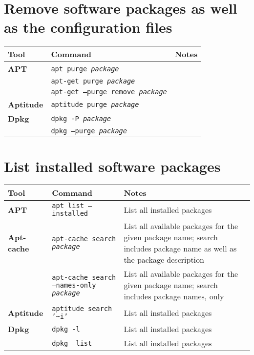 \documentclass[10pt]{article}
\begin{document}
\section{Remove software packages as well as the configuration files}
\begin{tabular}{ p{3.5cm} p{9cm} p{11cm}}
  \hline
  \rowcolor{Gray}
  \textbf{Tool} & \textbf{Command} & \textbf{Notes} \\
  \hline 
  \textbf{APT}& \texttt{apt purge \textit{package}} & \\
  \rowcolor{Gray}
  & \texttt{apt-get purge \textit{package}} & \\
  & \texttt{apt-get --purge remove \textit{package}} & \\
  \rowcolor{Gray}
  \textbf{Aptitude} & \texttt{aptitude purge \textit{package}} & \\
  \textbf{Dpkg} & \texttt{dpkg -P \textit{package}} & \\
  \rowcolor{Gray}
  & \texttt{dpkg --purge \textit{package}} & \\
  \hline
\end{tabular}

\section{List installed software packages}
\begin{tabular}{ p{3.5cm} p{9cm} p{11cm}}
  \hline
  \rowcolor{Gray}
  \textbf{Tool} & \textbf{Command} & \textbf{Notes} \\
  \hline 
  \textbf{APT}& \texttt{apt list --installed} & List all installed packages\\
  \rowcolor{Gray}
  \textbf{Apt-cache} & \texttt{apt-cache search \textit{package}} & List all available packages for the given package name; search includes package name as well as the package description \\
  & \texttt{apt-cache search --names-only \textit{package}} & List all available packages for the given package name; search includes package names, only \\
  \rowcolor{Gray}
  \textbf{Aptitude} & \texttt{aptitude search '\textasciitilde{}i'} & List all installed packages \\
  \textbf{Dpkg} & \texttt{dpkg -l} & List all installed packages \\
  \rowcolor{Gray}
  & \texttt{dpkg --list} & List all installed packages \\
  \hline
\end{tabular}
\end{document}
